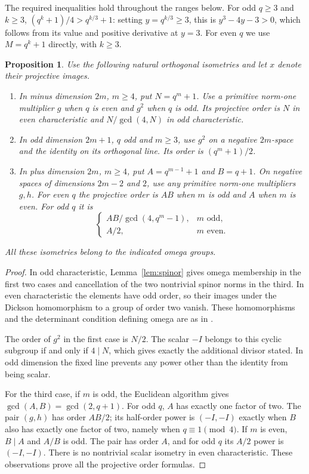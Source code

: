 \documentclass[11pt,a4paper]{article}
\newtheorem{proposition}[lemma]{Proposition}
\begin{document}
The required inequalities hold throughout the ranges below. For odd
$q\ge3$ and $k\ge3$,
$(q^k+1)/4>q^{k/3}+1$: setting $y=q^{k/3}\ge3$, this is
$y^3-4y-3>0$, which follows from its value and positive derivative at
$y=3$. For even $q$ we use $M=q^k+1$ directly, with $k\ge3$.

\begin{proposition}\label{prop:orders}
Use the following natural orthogonal isometries and let $x$ denote their
projective images.
\begin{enumerate}
\item In minus dimension $2m$, $m\ge4$, put $N=q^m+1$. Use a primitive
norm-one multiplier $g$ when $q$ is even and $g^2$ when $q$ is odd.
Its projective order is $N$ in even characteristic and
$N/\gcd(4,N)$ in odd characteristic.
\item In odd dimension $2m+1$, $q$ odd and $m\ge3$, use $g^2$ on a
negative $2m$-space and the identity on its orthogonal line.
Its order is $(q^m+1)/2$.
\item In plus dimension $2m$, $m\ge4$, put
$A=q^{m-1}+1$ and $B=q+1$. On negative spaces of dimensions $2m-2$ and
$2$, use any primitive norm-one multipliers $g,h$.
For even $q$ the projective order is $AB$ when $m$ is odd and $A$ when
$m$ is even. For odd $q$ it is
\[
 \begin{cases}
 AB/\gcd(4,q^m-1),&m\text{ odd},\\
 A/2,&m\text{ even}.
 \end{cases}
\]
\end{enumerate}
All these isometries belong to the indicated omega groups.
\end{proposition}
\begin{proof}
In odd characteristic, Lemma~\ref{lem:spinor} gives omega membership in
the first two cases and cancellation of the two nontrivial spinor norms
in the third. In even characteristic the elements have odd order, so
their images under the Dickson homomorphism to a group of order two
vanish. These homomorphisms and the determinant condition defining omega
are as in \cite[Section~3]{MRD}.

The order of $g^2$ in the first case is $N/2$. The scalar $-I$ belongs
to this cyclic subgroup if and only if $4\mid N$, which gives exactly
the additional divisor stated. In odd dimension the fixed line prevents
any power other than the identity from being scalar.

For the third case, if $m$ is odd, the Euclidean algorithm gives
$\gcd(A,B)=\gcd(2,q+1)$. For odd $q$, $A$ has exactly one factor of two.
The pair $(g,h)$ has order $AB/2$; its half-order power is $(-I,-I)$
exactly when $B$ also has exactly one factor of two, namely when
$q\equiv1\pmod4$. If $m$ is even, $B\mid A$ and $A/B$ is odd.
The pair has order $A$, and for odd $q$ its $A/2$ power is $(-I,-I)$.
There is no nontrivial scalar isometry in even characteristic. These
observations prove all the projective order formulas.
\end{proof}
\end{document}
